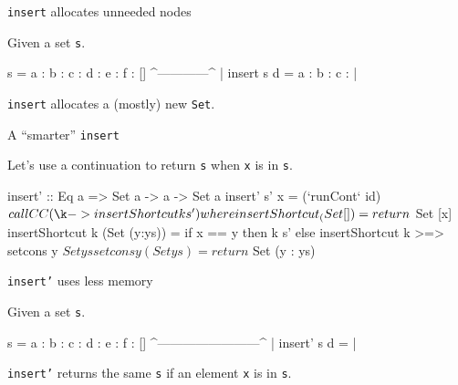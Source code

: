 \documentclass[ignorenonframetext,]{beamer}
\begin{document}
\begin{frame}[fragile]{\texttt{insert} allocates unneeded nodes}

Given a set \texttt{s}.

\begin{haskellcode}
s = a : b : c : d : e : f : []
                ^------------^
                         |
insert s d = a : b : c : |
\end{haskellcode}

\texttt{insert} allocates a (mostly) new \texttt{Set}.

\end{frame}

\begin{frame}[fragile]{A ``smarter'' \texttt{insert}}

Let's use a continuation to return \texttt{s} when \texttt{x} is in
\texttt{s}.

\begin{haskellcode}
insert' :: Eq a => Set a -> a -> Set a
insert' s' x = (`runCont` id) $ callCC (\k -> insertShortcut k s')
    where
        insertShortcut _ (Set [])     = return $ Set [x]
        insertShortcut k (Set (y:ys)) =
            if x == y
                then k s'
                else insertShortcut k >=> setcons y $ Set ys

        setcons y (Set ys) = return $ Set (y : ys)
\end{haskellcode}

\end{frame}

\begin{frame}[fragile]{\texttt{insert'} uses less memory}

Given a set \texttt{s}.

\begin{haskellcode}
s = a : b : c : d : e : f : []
    ^------------------------^
              |
insert' s d = |
\end{haskellcode}

\texttt{insert'} returns the same \texttt{s} if an element \texttt{x} is
in \texttt{s}.

\end{frame}

\begin{frame}[fragile]


\end{frame}
\end{document}
